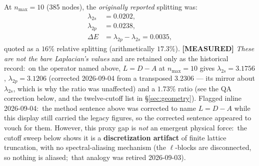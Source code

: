 \documentclass[aps,pra,twocolumn,superscriptaddress,longbibliography]{revtex4-2}
\begin{document}
At $n_{\max} = 10$ (385 nodes), the \emph{originally reported} splitting was:
\begin{align}
\lambda_{2s} &= 0.0202, \\
\lambda_{2p} &= 0.0238, \\
\Delta E &= \lambda_{2p} - \lambda_{2s} = 0.0035,
\end{align}
quoted as a $16\%$ relative splitting (arithmetically $17.3\%$).
\textbf{[MEASURED]} \emph{These are not the bare Laplacian's values} and are
retained only as the historical record:\ on the operator named above,
$L = D - A$ at $n_{\max} = 10$ gives $\lambda_{2s} = 3.1756$,
$\lambda_{2p} = 3.1206$ (corrected 2026-09-04 from a transposed $3.2306$ --- its mirror about $\lambda_{2s}$, which is why the ratio was unaffected) and a $1.73\%$ ratio (see the QA correction below,
and the twelve-cutoff list in \S\ref{sec:geometry}).  Flagged inline
2026-09-04:\ the method sentence above was corrected to name $L = D - A$ while
this display still carried the legacy figures, so the corrected sentence
appeared to vouch for them. However, this proxy gap
is \emph{not} an emergent physical force:\ the cutoff sweep below shows it
is a \textbf{discretization artifact} of finite lattice truncation, with
no spectral-aliasing mechanism (the $\ell$-blocks are disconnected, so
nothing is aliased;\ that analogy was retired 2026-09-03).
\end{document}
